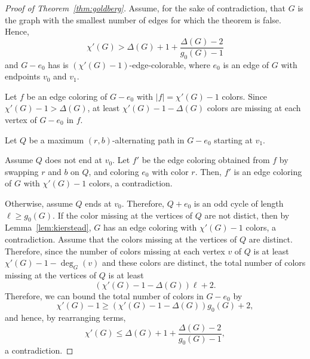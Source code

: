 \begin{proof}[Proof of Theorem~\ref{thm:goldberg}]
    Assume, for the sake of contradiction, that \(G\) is the graph with the smallest number of edges for which the theorem is false.
    Hence,
    \begin{equation}
        \chi'(G) > \Delta(G) + 1 + \frac{\Delta(G) - 2}{g_0(G) - 1}
    \end{equation}
    and \(G - e_0\) has is \((\chi'(G) - 1)\)-edge-colorable,
    where \(e_0\) is an edge of \(G\) with endpoints \(v_0\) and \(v_1\).

    Let \(f\) be an edge coloring of \(G - e_0\) with \(|f| = \chi'(G) - 1\) colors.
    Since \(\chi'(G) - 1 > \Delta(G)\),
    at least \(\chi'(G) - 1 - \Delta(G)\) colors are missing at each vertex of \(G - e_0\) in \(f\).

    Let \(Q\) be a maximum \((r, b)\)-alternating path in \(G - e_0\) starting at \(v_1\).

    Assume \(Q\) does not end at \(v_0\).
    Let \(f'\) be the edge coloring obtained from \(f\) by swapping \(r\) and \(b\) on \(Q\),
    and coloring \(e_0\) with color \(r\).
    Then, \(f'\) is an edge coloring of \(G\) with \(\chi'(G) - 1\) colors, a contradiction.

    Otherwise, assume \(Q\) ends at \(v_0\).
    Therefore, \(Q + e_0\) is an odd cycle of length \(\ell \geq g_0(G)\).
    If the color missing at the vertices of \(Q\) are not distict,
    then by Lemma~\ref{lem:kierstead},
    \(G\) has an edge coloring with \(\chi'(G) - 1\) colors, a contradiction.
    Assume that the colors missing at the vertices of \(Q\) are distinct.
    Therefore, since the number of colors missing at each vertex \(v\) of \(Q\) is at least \(\chi'(G) - 1 - \deg_G(v)\)
    and these colors are distinct,
    the total number of colors missing at the vertices of \(Q\) is at least
    \begin{equation}
        (\chi'(G) - 1 - \Delta(G)) \ell + 2.
    \end{equation}
    Therefore, we can bound the total number of colors in \(G - e_0\) by
    \begin{equation}
        \chi'(G) - 1 \geq (\chi'(G) - 1 - \Delta(G)) g_0(G) + 2,
    \end{equation}
    and hence, by rearranging terms,
    \begin{equation}
        \chi'(G) \leq \Delta(G) + 1 + \frac{\Delta(G) - 2}{g_0(G) - 1},
    \end{equation}
    a contradiction.
\end{proof}

